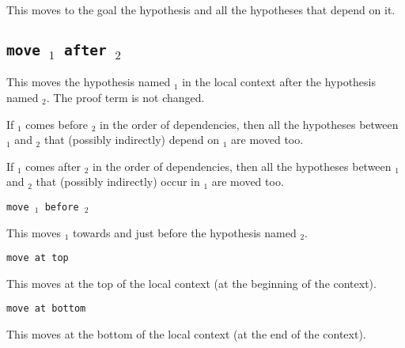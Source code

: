 \begin{coq_example*}
\begin{Variants}
 This moves to the goal the hypothesis {\ident} and all the hypotheses
 that depend on it.

\end{Variants}

\subsection{\tt move {\ident$_1$} after {\ident$_2$}}
\label{move}

This moves the hypothesis named {\ident$_1$} in the local context
after the hypothesis named {\ident$_2$}. The proof term is not changed.

If {\ident$_1$} comes before {\ident$_2$} in the order of dependencies,
then all the hypotheses between {\ident$_1$} and {\ident$_2$} that
(possibly indirectly) depend on {\ident$_1$} are moved too.

If {\ident$_1$} comes after {\ident$_2$} in the order of dependencies,
then all the hypotheses between {\ident$_1$} and {\ident$_2$} that
(possibly indirectly) occur in {\ident$_1$} are moved too.

\begin{Variants}

\item {\tt move {\ident$_1$} before {\ident$_2$}}

This moves {\ident$_1$} towards and just before the hypothesis named {\ident$_2$}.

\item {\tt move {\ident} at top}

This moves {\ident} at the top of the local context (at the beginning of the context).

\item {\tt move {\ident} at bottom}

This moves {\ident} at the bottom of the local context (at the end of the context).

\end{Variants}

\begin{ErrMsgs}

\item {}

\item {}

\item {}


\end{ErrMsgs}
\end{coq_example*}
